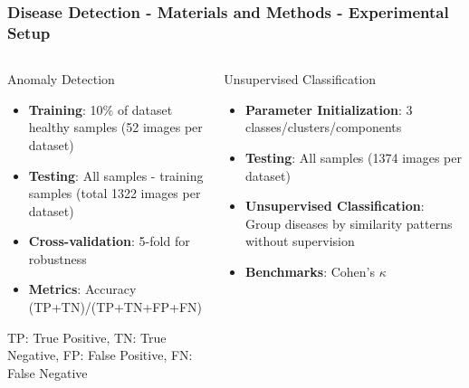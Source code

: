 \documentclass[aspectratio=43]{beamer}
\begin{document}
\begin{frame}
    \frametitle{\small Disease Detection - Materials and Methods - Experimental Setup}
    \begin{columns}
        \begin{column}{0.5\textwidth}
            \begin{block}{\small Anomaly Detection}
                \scriptsize
                \begin{itemize}
                    \item \textbf{Training}: 10\% of dataset healthy samples (52 images per dataset)
                    \item \textbf{Testing}: All samples - training samples (total 1322 images per dataset)
                    \item \textbf{Cross-validation}: 5-fold for robustness
                    \item \textbf{Metrics}: Accuracy\\ (TP+TN)/(TP+TN+FP+FN)
                \end{itemize}
                \tiny TP: True Positive, TN: True Negative, FP: False Positive, FN: False Negative
            \end{block}
        \end{column}
        
        \begin{column}{0.5\textwidth}
            \begin{block}{\small Unsupervised Classification}
                \scriptsize
                \begin{itemize}
                    \item \textbf{Parameter Initialization}: 3 classes/clusters/components
                    \item \textbf{Testing}: All samples (1374 images per dataset)
                    \item \textbf{Unsupervised Classification}: Group diseases by similarity patterns without supervision
                    \item \textbf{Benchmarks}: Cohen's $\kappa$
                \end{itemize}
            \end{block}
        \end{column}
    \end{columns}
\end{frame}
\end{document}

